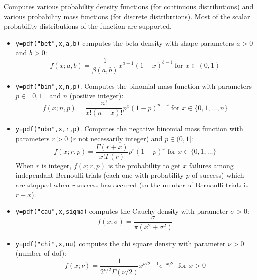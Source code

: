 \begin{mandescription}
  Computes various probability density functions (for continuous
  distributions) 
  and various probability mass functions (for discrete distributions). Most of the
  scalar probability distributions of the 
  function are supported. 
\begin{itemize}

\item {}  \verb!y=pdf("bet",x,a,b)! computes the beta
  density with shape parameters $a > 0$ and $b > 0$:
$$
     f(x; a, b) =
        \frac{1}{\beta(a,b)} x^{a-1}(1-x)^{b-1} \;
        \mbox{for } x \in (0,1)
$$

\item {} \verb!y=pdf("bin",x,n,p)!. Computes
  the binomial mass function with parameters $p \in [0,1]$ and $n$
  (positive integer):
$$
     f(x; n, p) = \frac{ n! }{ x! (n-x)!} p^x (1-p)^{n-x} \;\mbox{for } x \in \{0,1,\dots,n\}
$$

\item {} \verb!y=pdf("nbn",x,r,p)!. Computes
  the negative binomial mass function with parameters $r > 0$ ($r$ not
  necessarily integer) and $p \in (0,1]$:
$$
     f(x; r, p) = \frac{ \Gamma(r+x) }{ x! \Gamma(r)} p^r (1-p)^x \;\mbox{for } x \in \{0,1,\dots\}
$$
  When $r$ is integer, $f(x; r, p)$ is the probability to get $x$ failures among 
 independant Bernoulli trials (each one with probability $p$ of success) which are
 stopped when $r$ success has occured (so the number of Bernoulli trials is $r+x$).  

\item {} \verb!y=pdf("cau",x,sigma)! computes the Cauchy
  density with parameter $\sigma > 0$:
$$
     f(x; \sigma) = \frac{ \sigma }{ \pi ( x^2 + \sigma^2 ) }
$$


\item {} \verb!y=pdf("chi",x,nu)! computes the chi square
  density with parameter $\nu > 0$ (number of dof):
$$
     f(x; \nu) = \frac{1}{2^{\nu/2} \Gamma(\nu/2)} x^{\nu/2-1} e^{-x/2}\; \mbox{ for } x > 0 
$$




\end{itemize}
\end{mandescription}

